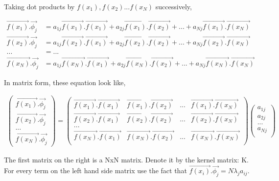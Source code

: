 \documentclass[11pt, a4paper]{article}
\begin{document}
Taking dot products by $f(x_1), f(x_2) ... f(x_N)$ successively,

\begin{align*}
       \vec{f(x_1)}.\vec{\phi_j} &= a_{1j}\vec{f(x_1)}.\vec{f(x_1)} + a_{2j}\vec{f(x_1)}.\vec{f(x_2)} + ... + a_{Nj}\vec{f(x_1)}.\vec{f(x_N)} \\
\vec{f(x_2)}.\vec{\phi_j} &= a_{1j}\vec{f(x_2)}.\vec{f(x_1)} + a_{2j}\vec{f(x_2)}.\vec{f(x_2)} + ... + a_{Nj}\vec{f(x_2)}.\vec{f(x_N)} \\ 
    ... &= ... \\
    \vec{f(x_N)}.\vec{\phi_j} &= a_{1j}\vec{f(x_N)}.\vec{f(x_1)} + a_{2j}\vec{f(x_N)}.\vec{f(x_2)} + ... + a_{Nj}\vec{f(x_N)}.\vec{f(x_N)}
\end{align*}

In matrix form, these equation look like,

\begin{align*}
    \begin{pmatrix}
        \vec{f(x_1)}.\vec{\phi_j} \\
        \vec{f(x_2)}.\vec{\phi_j} \\
        ... \\
        \vec{f(x_N)}.\vec{\phi_j} 
    \end{pmatrix} = \begin{pmatrix}
        \vec{f(x_1)}.\vec{f(x_1)} & \vec{f(x_1)}.\vec{f(x_2)} & ... &  \vec{f(x_1)}.\vec{f(x_N)} \\
        \vec{f(x_2)}.\vec{f(x_1)} & \vec{f(x_2)}.\vec{f(x_2)} & ... &  \vec{f(x_2)}.\vec{f(x_N)} \\
        ... \\
        \vec{f(x_N)}.\vec{f(x_1)} & \vec{f(x_N)}.\vec{f(x_2)} & ... &  \vec{f(x_N)}.\vec{f(x_N)} \\
    \end{pmatrix} \begin{pmatrix}
        a_{1j} \\
        a_{2j} \\
        ... \\
        a_{Nj} \\
    \end{pmatrix}
\end{align*}

The first matrix on the right is a NxN matrix. Denote it by the kernel matrix: K. For every term on the left hand side matrix use the fact that $\vec{f(x_i)}.\vec{\phi_j} = N\lambda_j a_{ij}$.
\end{document}

